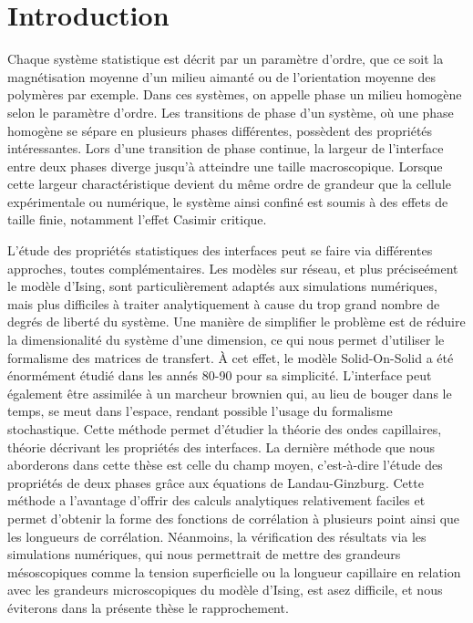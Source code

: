 \chapter*{Introduction}

Chaque système statistique est décrit par un paramètre d'ordre, que ce soit la magnétisation moyenne d'un milieu aimanté ou de l'orientation moyenne des polymères par exemple. Dans ces systèmes, on appelle phase un milieu homogène selon le paramètre d'ordre. Les transitions de phase d'un système, où une phase homogène se sépare en plusieurs phases différentes, possèdent des propriétés intéressantes. Lors d'une transition de phase continue, la largeur de l'interface entre deux phases diverge jusqu'à atteindre une taille macroscopique. Lorsque cette largeur charactéristique devient du même ordre de grandeur que la cellule expérimentale ou numérique, le système ainsi confiné est soumis à des effets de taille finie, notamment l'effet Casimir critique.

L'étude des propriétés statistiques des interfaces peut se faire via différentes approches, toutes complémentaires. Les modèles sur réseau, et plus préciseément le modèle d'Ising, sont particulièrement adaptés aux simulations numériques, mais plus difficiles à traiter analytiquement à cause du trop grand nombre de degrés de liberté du système. Une manière de simplifier le problème est de réduire la dimensionalité du système d'une dimension, ce qui nous permet d'utiliser le formalisme des matrices de transfert. À cet effet, le modèle Solid-On-Solid a été énormément étudié dans les annés 80-90 pour sa simplicité. L'interface peut également être assimilée à un marcheur brownien qui, au lieu de bouger dans le temps, se meut dans l'espace, rendant possible l'usage du formalisme stochastique. Cette méthode permet d'étudier la théorie des ondes capillaires, théorie décrivant les propriétés des interfaces. 
La dernière méthode que nous aborderons dans cette thèse est celle du champ moyen, c'est-à-dire l'étude des propriétés de deux phases grâce aux équations de Landau-Ginzburg. Cette méthode a l'avantage d'offrir des calculs analytiques relativement faciles et permet d'obtenir la forme des fonctions de corrélation à plusieurs point ainsi que les longueurs de corrélation. Néanmoins, la vérification des résultats via les simulations numériques, qui nous permettrait de mettre des grandeurs mésoscopiques comme la tension superficielle ou la longueur capillaire en relation avec les grandeurs microscopiques du modèle d'Ising, est asez difficile, et nous éviterons dans la présente thèse le rapprochement.

